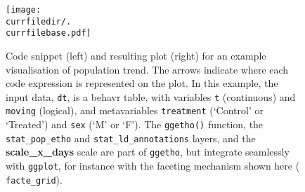 \begin{figure}[h!]
	\centering   
	\texttt{[image: \\currfiledir/.\\currfilebase.pdf]}
	  \caption[Visualisation with \texttt{ggetho}]{
  	Code snippet (left) and resulting plot (right) for an example visualisation of population trend. 
  	The arrows indicate where each code expression is represented on the plot.
  	In this example, the input data, \texttt{dt}, is a behavr table, with variables \texttt{t} (continuous) and \texttt{moving} (logical),
	and metavariables \texttt{treatment} (`Control' or `Treated') and \texttt{sex} (`M' or `F').
    The \texttt{ggetho()} function, the \texttt{stat\_pop\_etho} and \texttt{stat\_ld\_annotations} layers, and the \textbf{scale\_x\_days} scale are part of \texttt{ggetho}, but integrate seamlessly 
    with \texttt{ggplot}, for instance with the faceting mechanism shown here (\ie{} \texttt{facte\_grid}).
	\label{fig:\currfilebase}
}
\end{figure}
